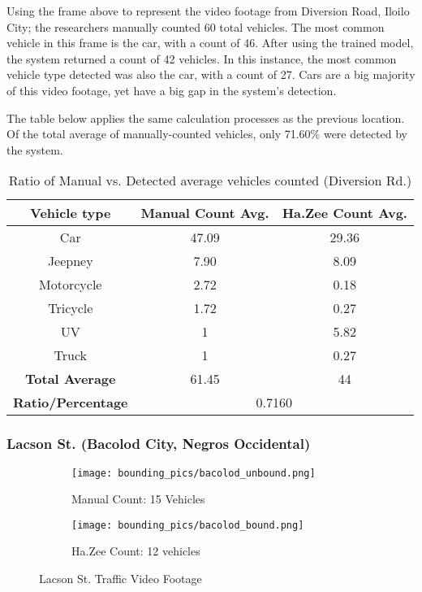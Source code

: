 Using the frame above to represent the video footage from Diversion Road, Iloilo City; the researchers manually counted 60 total vehicles. The most common vehicle in this frame is the car, with a count of 46. After using the trained model, the system returned a count of 42 vehicles. In this instance, the most common vehicle type detected was also the car, with a count of 27. Cars are a big majority of this video footage, yet have a big gap in the system’s detection.

The table below applies the same calculation processes as the previous location. Of the total average of manually-counted vehicles, only 71.60\% were detected by the system. 




\begin{table}[ht]   %
	\centering
	\caption{Ratio of Manual vs. Detected average vehicles counted  (Diversion Rd.)} \vspace{0.25em}
	\begin{tabular}{c|c|c} \hline
		\centering \textbf {Vehicle type}& \textbf{Manual Count Avg.} & \textbf{Ha.Zee Count Avg.}\\ \hline
		Car & 47.09 & 29.36   \\ 
		Jeepney & 7.90 & 8.09 	\\ 
		Motorcycle& 2.72  & 0.18  \\ 
		Tricycle   & 1.72  & 0.27  \\ 
		UV & 1 & 5.82  \\ 
		Truck & 1 & 0.27 \\ \hline
		
		\textbf{Total Average} & 61.45 & 44\\ \hline
		
		\textbf{Ratio/Percentage} & \multicolumn{2}{c}{0.7160}  \\ \hline
		
	\end{tabular}
	\label{tab:diversion_rd}
\end{table}



\subsubsection{Lacson St. (Bacolod City, Negros Occidental)
}


\begin{figure}[!htbp]
	\begin{subfigure}{.5\textwidth}
		\centering
		\texttt{[image: bounding\_pics/bacolod\_unbound.png]}
		\caption{Manual Count: 15 Vehicles}
		
	\end{subfigure}%
	\begin{subfigure}{.5\textwidth}
		\centering
		\texttt{[image: bounding\_pics/bacolod\_bound.png]}
		\caption{Ha.Zee Count: 12 vehicles}
	\end{subfigure}
	\caption{Lacson St. Traffic Video Footage}
\end{figure}
\FloatBarrier

